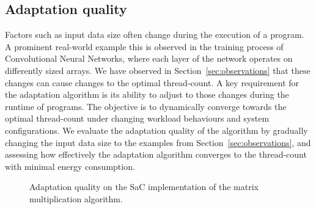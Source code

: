 \documentclass[runningheads]{llncs}
\begin{document}
\subsection{Adaptation quality}\label{sec:evaluation-adaptation}
Factors such as input data size often change during the execution of a program.
A prominent real-world example this is observed in the training process of Convolutional Neural Networks, where each layer of the network operates on differently sized arrays.
We have observed in Section~\ref{sec:observations} that these changes can cause changes to the optimal thread-count.
A key requirement for the adaptation algorithm is its ability to adjust to those changes during the runtime of programs.
The objective is to dynamically converge towards the optimal thread-count under changing workload behaviours and system configurations.
We evaluate the adaptation quality of the algorithm by gradually changing the input data size to the examples from Section~\ref{sec:observations}, and assessing how effectively the adaptation algorithm converges to the thread-count with minimal energy consumption.

\begin{figure}[!t]
  \centering
  \tiny
  \captionsetup{width=.45\linewidth}
  \begin{minipage}{.5\linewidth}
    \centering
    \caption{Adaptation quality on the SaC implementation of the N-body simulation.}%
    \label{fig:adapt-nbody}
  \end{minipage}%
  \begin{minipage}{.5\linewidth}
    \centering
    \caption{Adaptation quality on the SaC implementation of the matrix multiplication algorithm.}%
    \label{fig:adapt-matmul}
  \end{minipage}%
\end{figure}
\end{document}

